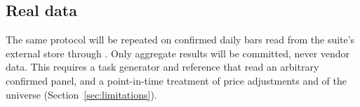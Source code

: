 \subsection{Real data}
The same protocol will be repeated on confirmed daily bars read from the
suite's external store through . Only aggregate results
will be committed, never vendor data. This requires a task generator and
reference that read an arbitrary confirmed panel, and a point-in-time
treatment of price adjustments and of the universe
(Section~\ref{sec:limitations}). 

